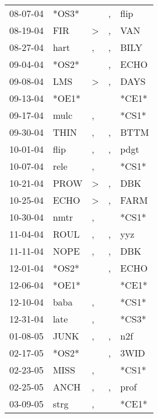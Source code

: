 \begin{supertabular}{lllll}
 08-07-04 &  *OS3* &                  &                , &   flip \\
 08-19-04 &    FIR &     \textgreater &                , &    VAN \\
 08-27-04 &   hart &                , &                , &   BILY \\
 09-04-04 &  *OS2* &                  &                , &   ECHO \\
 09-08-04 &    LMS &     \textgreater &                , &   DAYS \\
 09-13-04 &  *OE1* &                  &                  &  *CE1* \\
 09-17-04 &   mulc &                , &                  &  *CS1* \\
 09-30-04 &   THIN &                , &                , &   BTTM \\
 10-01-04 &   flip &                , &                , &   pdgt \\
 10-07-04 &   rele &                , &                  &  *CS1* \\
 10-21-04 &   PROW &     \textgreater &                , &    DBK \\
 10-25-04 &   ECHO &     \textgreater &                , &   FARM \\
 10-30-04 &   nmtr &                , &                  &  *CS1* \\
 11-04-04 &   ROUL &                , &                , &    yyz \\
 11-11-04 &   NOPE &                , &                , &    DBK \\
 12-01-04 &  *OS2* &                  &                , &   ECHO \\
 12-06-04 &  *OE1* &                  &                  &  *CE1* \\
 12-10-04 &   baba &                , &                  &  *CS1* \\
 12-31-04 &   late &                , &                  &  *CS3* \\
 01-08-05 &   JUNK &                , &                , &    n2f \\
 02-17-05 &  *OS2* &                  &                , &   3WID \\
 02-23-05 &   MISS &                , &                  &  *CS1* \\
 02-25-05 &   ANCH &                , &                , &   prof \\
 03-09-05 &   strg &                , &                  &  *CE1* \\

\end{supertabular}
